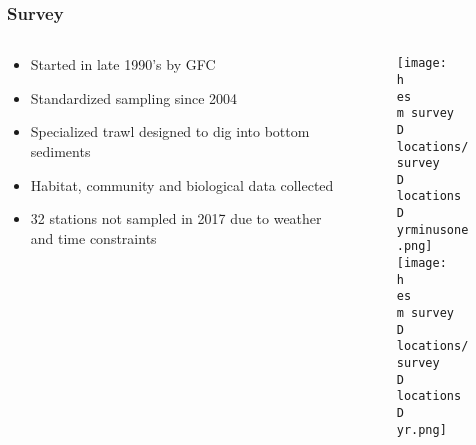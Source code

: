\documentclass{beamer}
\numberwithin{equation}{section}		%
\numberwithin{figure}{section}	   	%
\numberwithin{table}{section}				%
\newcommand{\yr}{2017}
\newcommand{\yrminusone}{2016}
\newcommand{\D}{.}  %
\newcommand{\h}{C:/} %
\newcommand{\es}{bio.data/bio.snowcrab/} %
\newcommand{\m}{output/maps/} %
\begin{document}
%

%


\begin{frame}
\frametitle{Survey}
 
  	\begin{columns}
  		\begin{column}{0.4\textwidth}
  		 \begin{itemize}
  		 	\item Started in late 1990's by GFC
  		 	\item Standardized sampling since 2004
  		 	\item Specialized trawl designed to dig into bottom sediments
  		 	\item Habitat, community and biological data collected
  		 	\item 32 stations not sampled in 2017 due to weather and time constraints %
  		 \end{itemize}
  		\end{column}
  		
  		\begin{column}{0.6\textwidth}
  			\begin{centering}
  					\begin{figure}
  						\texttt{[image: \\h \\es \\m survey\\D locations/survey\\D locations\\D \\yrminusone.png]}\\   
  						\texttt{[image: \\h \\es \\m survey\\D locations/survey\\D locations\\D \\yr.png]}\\   
  					\end{figure}
  		
  			\end{centering}
  		\end{column}
  	\end{columns}
  		
  \end{frame}
\end{document}

